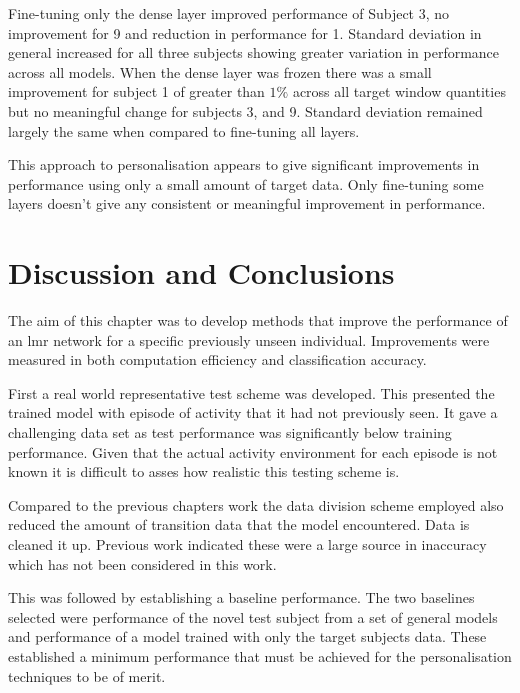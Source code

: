 Fine-tuning only the dense layer improved performance of Subject 3, no improvement for 9 and reduction in performance for 1. Standard deviation in general increased for all three subjects showing greater variation in performance across all models. When the dense layer was frozen there was a small improvement for subject 1 of greater than $1\%$ across all target window quantities but no meaningful change for subjects 3, and 9. Standard deviation remained largely the same when compared to fine-tuning all layers.

This approach to personalisation appears to give significant improvements in performance using only a small amount of target data. Only fine-tuning some layers doesn't give any consistent or meaningful improvement in performance.

\section{Discussion and Conclusions}
\label{sec:personalisation-discussion}
The aim of this chapter was to develop methods that improve the performance of an \acrshort{lmr} network for a specific previously unseen individual. Improvements were measured in both computation efficiency and classification accuracy.

First a real world representative test scheme was developed. This presented the trained model with episode of activity that it had not previously seen. It gave a challenging data set as test performance was significantly below training performance. Given that the actual activity environment for each episode is not known it is difficult to asses how realistic this testing scheme is. 

Compared to the previous chapters work the data division scheme employed also reduced the amount of transition data that the model encountered. Data is cleaned it up. Previous work indicated these were a large source in inaccuracy which has not been considered in this work.

This was followed by establishing a baseline performance. The two baselines selected were performance of the novel test subject from a set of general models and performance of a model trained with only the target subjects data. These established a minimum performance that must be achieved for the personalisation techniques to be of merit.

